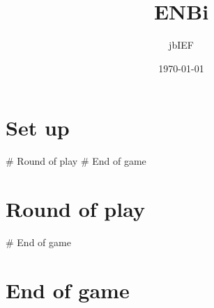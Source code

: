 \documentclass{article}%
\title{ENBi}%
\author{jbIEF}%
\date{\today}%
\begin{document}
%
\pagestyle{empty}%
\normalsize%
\maketitle%
\section{ Set up
}%
\label{sec:Setup}%
\# Round of play 
%
\# End of game

%
\section{ Round of play 
}%
\label{sec:Roundofplay}%
\# End of game

%
\section{ End of game}%
\label{sec:Endofgame}%

%
\end{document}
